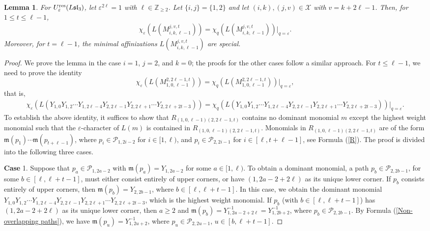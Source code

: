 \documentclass[11pt, reqno]{amsart}
\theoremstyle{plain}
\newtheorem{lemma}[theorem]{Lemma}
\theoremstyle{definition}
\numberwithin{equation}{section}
\newcommand{\ZZ}{{\mathbb {Z}}}
\newcommand{\res}{{\rm res}}
\begin{document}
\begin{lemma}\label{Lem: minimal affine is special}
For $U_{\varepsilon}^{\res}({L\mathfrak{sl}_{3}})$, let $\varepsilon^{2 \ell}=1$ with $\ell\in \ZZ_{\geq 2}$. Let $\{i,j\}=\{1,2\}$ and let $(i,k), (j,v)\in\mathcal{X}$ with $v=k+2 \ell-1$. Then, for $1\leq t \leq \ell-1$, 
\begin{align*}
\chi_\varepsilon(L(M^{j,v,t}_{i,k,\ell-1}))=\chi_q(L(M^{j,v,t}_{i,k,\ell-1}))|_{q=\varepsilon}.
\end{align*}
Moreover, for $t=\ell-1$, the minimal affinizations $L(M^{j,v,t}_{i,k,\ell-1})$ are special.
\end{lemma}

\begin{proof}
We prove the lemma in the case $i=1$, $j=2$, and $k=0$; the proofs for the other cases follow a similar approach. For $t\leq \ell-1$, we need to prove the identity 
\[
\chi_\varepsilon(L(M^{2, 2\ell-1,t}_{1,0,\ell-1}))=\chi_q(L(M^{2,2\ell-1,t}_{1,0,\ell-1}))|_{q=\varepsilon},
\]
that is,
{\small
\begin{align*}
\chi_\varepsilon(L(Y_{1,0}Y_{1,2}\cdots Y_{1,2\ell-4}Y_{2,2\ell-1}Y_{2,2\ell+1}\cdots Y_{2,2 \ell+2t-3}))=\chi_q(L(Y_{1,0}Y_{1,2}\cdots Y_{1,2\ell-4}Y_{2,2\ell-1}Y_{2,2\ell+1}\cdots Y_{2,2\ell+2t-3}))|_{q=\varepsilon}.
\end{align*}}
To establish the above identity, it suffices to show that $R_{(1,0,\ell-1)(2,2\ell-1,t)}$ contains no dominant monomial $m$ except the highest weight monomial such that the $\varepsilon$-character of $L(m)$ is contained in $R_{(1,0,\ell-1)(2,2\ell-1,t)}$. Monomials in $R_{(1,0,\ell-1)(2,2\ell-1,t)}$ are of the form $\mathfrak{m}(p_1)\cdots \mathfrak{m}(p_{t+\ell-1})$, where  $p_i \in \mathscr{P}_{1,2i-2}$ for $i\in[1, \ell)$, and $p_i \in \mathscr{P}_{2,2i-1}$ for $i\in[\ell, t+\ell-1]$, see Formula (\ref{R}). The proof is divided into the following three cases.

{\bf Case} 1. Suppose that $p_a\in \mathscr{P}_{1,2a-2}$ with $\mathfrak{m}(p_a)=Y_{1,2a-2}$ for some $a\in[1, \ell)$. To obtain a dominant monomial, a path $p_b\in \mathscr{P}_{2,2b-1}$, for some $b\in[\ell,\ell+t-1]$, must either consist entirely of upper corners, or have $(1,2a-2+2 \ell)$ as its unique lower corner. If $p_b$ consists entirely of upper corners, then $\mathfrak{m}(p_b)=Y_{2,2b-1}$, where $b\in[\ell,\ell+t-1]$. In this case, we obtain the dominant monomial $Y_{1,0}Y_{1,2}\cdots Y_{1,2\ell-4}Y_{2,2\ell-1}Y_{2,2\ell+1}\cdots Y_{2,2\ell+2t-3}$, which is the highest weight monomial. If $p_b$ (with $b\in[\ell,\ell+t-1]$) has $(1,2a-2+2\ell)$ as its unique lower corner, then $a\geq 2$ and $\mathfrak{m}(p_b)=Y^{-1}_{1,2a-2+2 \ell}=Y^{-1}_{1,2b+2}$, where $p_b\in\mathscr{P}_{2,2b-1}$. By Formula (\ref{Non-overlapping paths}), we have $\mathfrak{m}(p_u)=Y^{-1}_{1,2u+2}$, where $p_u\in\mathscr{P}_{2,2u-1}$, $u\in [b, \ell+t-1]$.


\end{proof}
\end{document}
